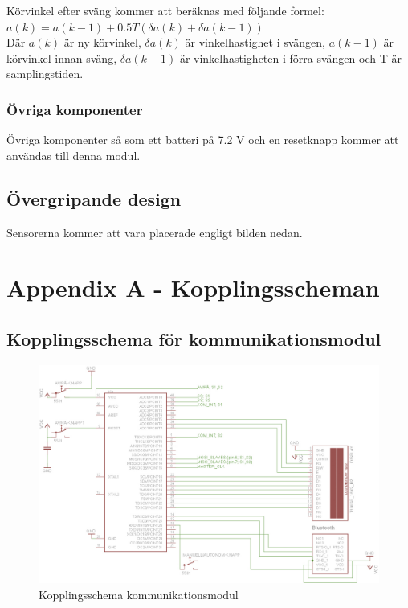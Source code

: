 \documentclass[a4paper,12pt,fleqn]{article}
\begin{document}
Körvinkel efter sväng kommer att beräknas med följande formel: \newline
$ a(k) = a(k-1)+0.5T(\delta a(k)+\delta a(k-1))$ \\
Där $a(k)$ är ny körvinkel, $\delta a(k)$ är vinkelhastighet i svängen, $a(k-1)$ är körvinkel innan sväng, $\delta a(k-1)$ är vinkelhastigheten i förra svängen och T är samplingstiden.

\subsubsection{Övriga komponenter}
Övriga komponenter så som ett batteri på 7.2 V och en resetknapp kommer att användas till denna modul.

\subsection{Övergripande design}
Sensorerna kommer att vara placerade engligt bilden nedan.


\newpage
\appendix
\pagestyle{empty}
\section{Appendix A - Kopplingsscheman}
\subsection{Kopplingsschema för kommunikationsmodul}

\begin{figure}[ht] %
  \begin{center}
  \includegraphics[keepaspectratio=true,width=\linewidth]{komschema.jpg}  %
  \end{center}
  \caption{Kopplingsschema kommunikationsmodul} %
  \label{fig:kopplingkom} %
\end{figure}
 \clearpage %
 
\end{document}

